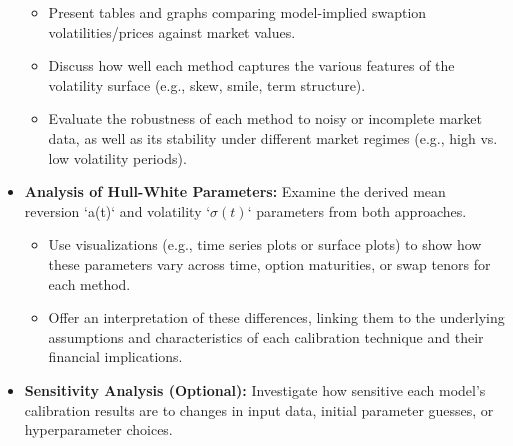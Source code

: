 \begin{itemize}
    \begin{itemize}
        \item Present tables and graphs comparing model-implied swaption volatilities/prices against market values.
        \item Discuss how well each method captures the various features of the volatility surface (e.g., skew, smile, term structure).
        \item Evaluate the robustness of each method to noisy or incomplete market data, as well as its stability under different market regimes (e.g., high vs. low volatility periods).
    \end{itemize}
    \item \textbf{Analysis of Hull-White Parameters:} Examine the derived mean reversion `a(t)` and volatility `$\sigma(t)$` parameters from both approaches.
    \begin{itemize}
        \item Use visualizations (e.g., time series plots or surface plots) to show how these parameters vary across time, option maturities, or swap tenors for each method.
        \item Offer an interpretation of these differences, linking them to the underlying assumptions and characteristics of each calibration technique and their financial implications.
    \end{itemize}
    \item \textbf{Sensitivity Analysis (Optional):} Investigate how sensitive each model's calibration results are to changes in input data, initial parameter guesses, or hyperparameter choices.
\end{itemize}
